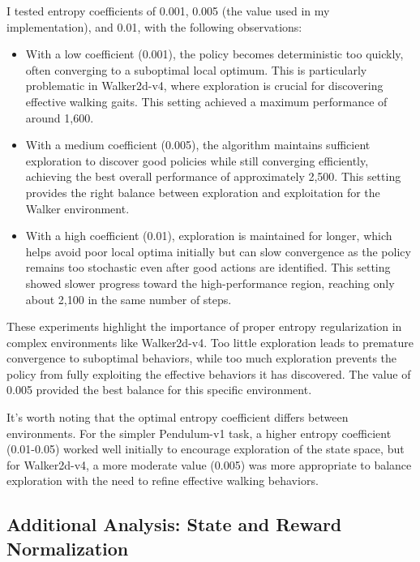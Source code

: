 \documentclass[a4paper,twocolumn]{article}
\begin{document}
I tested entropy coefficients of 0.001, 0.005 (the value used in my implementation), and 0.01, with the following observations:

\begin{itemize}
    \item With a low coefficient (0.001), the policy becomes deterministic too quickly, often converging to a suboptimal local optimum. This is particularly problematic in Walker2d-v4, where exploration is crucial for discovering effective walking gaits. This setting achieved a maximum performance of around 1,600.
    
    \item With a medium coefficient (0.005), the algorithm maintains sufficient exploration to discover good policies while still converging efficiently, achieving the best overall performance of approximately 2,500. This setting provides the right balance between exploration and exploitation for the Walker environment.
    
    \item With a high coefficient (0.01), exploration is maintained for longer, which helps avoid poor local optima initially but can slow convergence as the policy remains too stochastic even after good actions are identified. This setting showed slower progress toward the high-performance region, reaching only about 2,100 in the same number of steps.
\end{itemize}

These experiments highlight the importance of proper entropy regularization in complex environments like Walker2d-v4. Too little exploration leads to premature convergence to suboptimal behaviors, while too much exploration prevents the policy from fully exploiting the effective behaviors it has discovered. The value of 0.005 provided the best balance for this specific environment.

It's worth noting that the optimal entropy coefficient differs between environments. For the simpler Pendulum-v1 task, a higher entropy coefficient (0.01-0.05) worked well initially to encourage exploration of the state space, but for Walker2d-v4, a more moderate value (0.005) was more appropriate to balance exploration with the need to refine effective walking behaviors.

\subsection{Additional Analysis: State and Reward Normalization}
\end{document}
